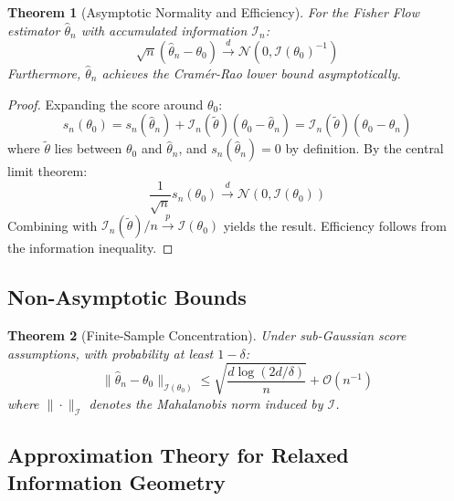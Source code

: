 \documentclass[11pt]{article}
\newtheorem{theorem}{Theorem}
\begin{document}
\begin{theorem}[Asymptotic Normality and Efficiency]
\label{thm:asymptotic_normality}
For the Fisher Flow estimator $\hat{\theta}_n$ with accumulated information $\mathcal{I}_n$:
\begin{equation}
\sqrt{n}(\hat{\theta}_n - \theta_0) \xrightarrow{d} \mathcal{N}(0, \mathcal{I}(\theta_0)^{-1})
\end{equation}
Furthermore, $\hat{\theta}_n$ achieves the Cramér-Rao lower bound asymptotically.
\end{theorem}

\begin{proof}
Expanding the score around $\theta_0$:
\begin{equation}
s_n(\theta_0) = s_n(\hat{\theta}_n) + \mathcal{I}_n(\tilde{\theta})(\theta_0 - \hat{\theta}_n) = \mathcal{I}_n(\tilde{\theta})(\theta_0 - \hat{\theta}_n)
\end{equation}
where $\tilde{\theta}$ lies between $\theta_0$ and $\hat{\theta}_n$, and $s_n(\hat{\theta}_n) = 0$ by definition. By the central limit theorem:
\begin{equation}
\frac{1}{\sqrt{n}}s_n(\theta_0) \xrightarrow{d} \mathcal{N}(0, \mathcal{I}(\theta_0))
\end{equation}
Combining with $\mathcal{I}_n(\tilde{\theta})/n \xrightarrow{p} \mathcal{I}(\theta_0)$ yields the result. Efficiency follows from the information inequality.
\end{proof}

\subsection{Non-Asymptotic Bounds}

\begin{theorem}[Finite-Sample Concentration]
\label{thm:concentration}
Under sub-Gaussian score assumptions, with probability at least $1-\delta$:
\begin{equation}
\|\hat{\theta}_n - \theta_0\|_{\mathcal{I}(\theta_0)} \leq \sqrt{\frac{d \log(2d/\delta)}{n}} + \mathcal{O}(n^{-1})
\end{equation}
where $\|\cdot\|_{\mathcal{I}}$ denotes the Mahalanobis norm induced by $\mathcal{I}$.
\end{theorem}

\subsection{Approximation Theory for Relaxed Information Geometry}
\end{document}
